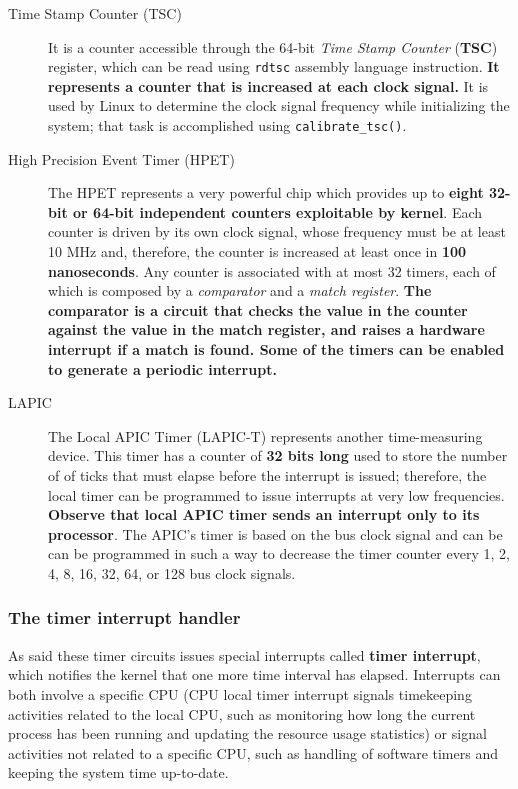 \documentclass[10pt,a4paper]{article}
\begin{document}
\begin{description}
\item[Time Stamp Counter (TSC)] It is a counter accessible through the 64-bit \textit{Time Stamp Counter} (\textbf{TSC}) register, which can be read using \texttt{rdtsc} assembly language instruction. \textbf{It represents a counter that is increased at each clock signal.} It is used by Linux to determine the clock signal frequency while initializing the system; that task is accomplished using \texttt{calibrate\_tsc()}.
\item[High Precision Event Timer (HPET)] The HPET represents a very powerful chip which provides up to \textbf{eight 32-bit or 64-bit independent counters exploitable by kernel}. Each counter is driven by its own clock signal, whose frequency must be at least 10 MHz and, therefore, the counter is increased at least once in \textbf{100 nanoseconds}. Any counter is associated with at most 32 timers, each of which is composed by a \textit{comparator} and a \textit{match register}. \textbf{The comparator is a circuit that checks the value in the counter against the value in the match register, and raises a hardware interrupt if a match is found. Some of the timers can be enabled to generate a periodic interrupt.}
\item[LAPIC] The Local APIC Timer (LAPIC-T) represents another time-measuring device. This timer has a counter of \textbf{32 bits long} used to store the number of of ticks that must elapse before the interrupt is issued; therefore, the local timer can be programmed to issue interrupts at very low frequencies. \textbf{Observe that local APIC timer sends an interrupt only to its processor}. The APIC’s timer is based on the bus clock signal and can be can be programmed in such a way to decrease the timer counter every 1, 2, 4, 8, 16, 32, 64, or 128 bus clock signals.
\end{description}

\subsubsection{The timer interrupt handler}

As said these timer circuits issues special interrupts called \textbf{timer interrupt}, which notifies the kernel
that one more time interval has elapsed. Interrupts can both involve a specific CPU (CPU local timer interrupt signals timekeeping activities related to the local CPU, such as monitoring how long the current process has been running and updating the resource usage statistics) or signal activities not related to a specific CPU, such as handling of software timers and keeping the system time up-to-date.
\end{document}
